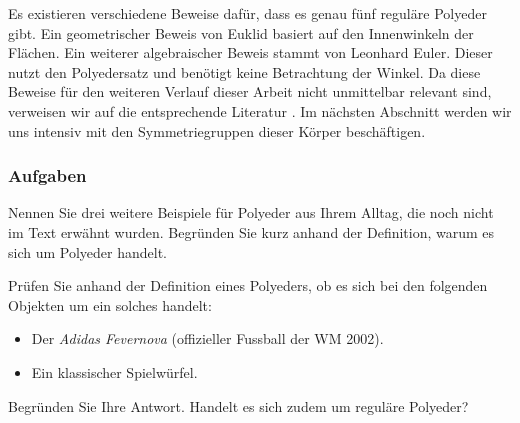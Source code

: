 Es existieren verschiedene Beweise dafür, dass es genau fünf reguläre Polyeder gibt. Ein geometrischer Beweis von Euklid basiert auf den Innenwinkeln der Flächen. Ein weiterer algebraischer Beweis stammt von Leonhard Euler. Dieser nutzt den Polyedersatz und benötigt keine Betrachtung der Winkel. Da diese Beweise für den weiteren Verlauf dieser Arbeit nicht unmittelbar relevant sind, verweisen wir auf die entsprechende Literatur \cite[Kap.~2]{coxeter_regular_polytopes_1973, cromwell_polyhedra_1997}. Im nächsten Abschnitt werden wir uns intensiv mit den Symmetriegruppen dieser Körper beschäftigen.


\subsubsection{Aufgaben}

\begin{exercise} \label{ex:polyederalltag}
    Nennen Sie drei weitere Beispiele für Polyeder aus Ihrem Alltag, die noch nicht im Text erwähnt wurden. Begründen Sie kurz anhand der Definition, warum es sich um Polyeder handelt.
\end{exercise}

\begin{exercise} \label{ex:polyederbeispiele}
    Prüfen Sie anhand der Definition eines Polyeders, ob es sich bei den folgenden Objekten um ein solches handelt:
    \begin{itemize}
        \item[a)] Der \textit{Adidas Fevernova} (offizieller Fussball der WM 2002).
        \item[b)] Ein klassischer Spielwürfel.
    \end{itemize}
    Begründen Sie Ihre Antwort. Handelt es sich zudem um reguläre Polyeder?
\end{exercise}
